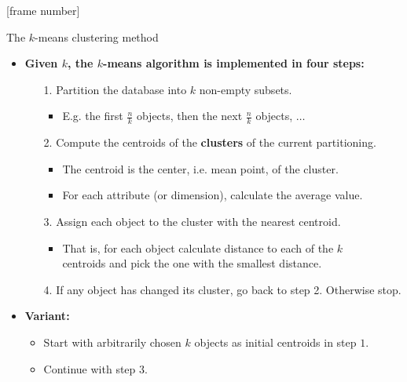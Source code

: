 \documentclass[aspectratio=169,t,xcolor=dvipsnames]{beamer}
\begin{document}
  {
    [frame number]
    \begin{frame}{The $k$-means clustering method}
        \begin{itemize}
          \item \textbf{Given $k$, the $k$-means algorithm is implemented in four steps:}
          \begin{itemize}
            \item[1.] Partition the database into $k$ non-empty subsets.
            \begin{itemize}
              \item E.g. the first $\frac{n}{k}$ objects, then the next $\frac{n}{k}$ objects, $\ldots$
            \end{itemize}
            \item[2.] Compute the centroids of the \textbf{clusters} of the current partitioning.
            \begin{itemize}
              \item The centroid is the center, i.e. mean point, of the cluster.
              \item For each attribute (or dimension), calculate the average value.
            \end{itemize}
            \item[3.] Assign each object to the cluster with the nearest centroid.
            \begin{itemize}
              \item That is, for each object calculate distance to each of the $k$\\
              centroids and pick the one with the smallest distance.
            \end{itemize}
          \item[4.] If any object has changed its cluster, go back to step 2. Otherwise stop.
          \end{itemize}
          \item \textbf{Variant:}
          \begin{itemize}
            \item Start with arbitrarily chosen $k$ objects as initial centroids in step $1$.
            \item Continue with step $3$.
          \end{itemize}
        \end{itemize}
    \end{frame}
  }
\end{document}

